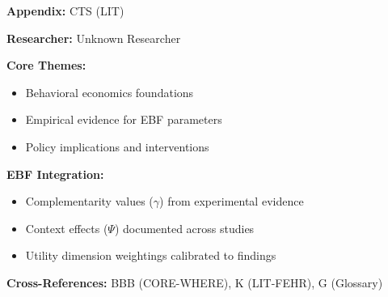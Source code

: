 \begin{tcolorbox}[colback=blue!5!white, colframe=blue!75!black,
    title=Quick Reference: Unknown Researcher Research]

\textbf{Appendix:} CTS (LIT)

\textbf{Researcher:} Unknown Researcher

\textbf{Core Themes:}
\begin{itemize}[nosep]
\item Behavioral economics foundations
\item Empirical evidence for EBF parameters
\item Policy implications and interventions
\end{itemize}

\textbf{EBF Integration:}
\begin{itemize}[nosep]
\item Complementarity values ($\gamma$) from experimental evidence
\item Context effects ($\Psi$) documented across studies
\item Utility dimension weightings calibrated to findings
\end{itemize}

\textbf{Cross-References:} BBB (CORE-WHERE), K (LIT-FEHR), G (Glossary)
\end{tcolorbox}


